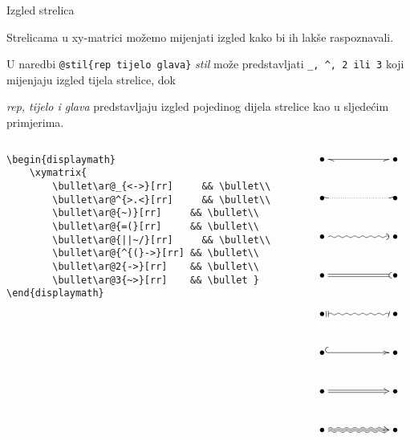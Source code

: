 \begin{frame}{Izgled strelica}

Strelicama u xy-matrici možemo mijenjati izgled kako bi ih lakše raspoznavali.\newline

U naredbi \verb|@stil{rep tijelo glava}| \textit{stil} može predstavljati \verb|_, ^, 2 ili 3| koji mijenjaju izgled tijela strelice, dok\newline

\textit{rep, tijelo i glava} predstavljaju izgled pojedinog dijela strelice kao u sljedećim primjerima.

\begin{columns}[c]

\begin{column}{0.5\textwidth}

\begin{Verbatim}[fontsize=\tiny]
\begin{displaymath}
    \xymatrix{
        \bullet\ar@_{<->}[rr]     && \bullet\\
        \bullet\ar@^{>.<}[rr]     && \bullet\\
        \bullet\ar@{~)}[rr]     && \bullet\\
        \bullet\ar@{=(}[rr]     && \bullet\\
        \bullet\ar@{||~/}[rr]     && \bullet\\
        \bullet\ar@{^{(}->}[rr] && \bullet\\
        \bullet\ar@2{->}[rr]    && \bullet\\
        \bullet\ar@3{~>}[rr]    && \bullet }
\end{displaymath}
\end{Verbatim}

\end{column}

\begin{column}{0.5\textwidth}%

\begin{displaymath}
    \xymatrix{
        \bullet\ar@_{<->}[rr]     && \bullet\\
        \bullet\ar@^{>.<}[rr]     && \bullet\\
        \bullet\ar@{~)}[rr]     && \bullet\\
        \bullet\ar@{=(}[rr]     && \bullet\\
        \bullet\ar@{||~/}[rr]     && \bullet\\
        \bullet\ar@{^{(}->}[rr] && \bullet\\
        \bullet\ar@2{->}[rr]    && \bullet\\
        \bullet\ar@3{~>}[rr]    && \bullet }
\end{displaymath}

\end{column}

\end{columns}

\end{frame}

